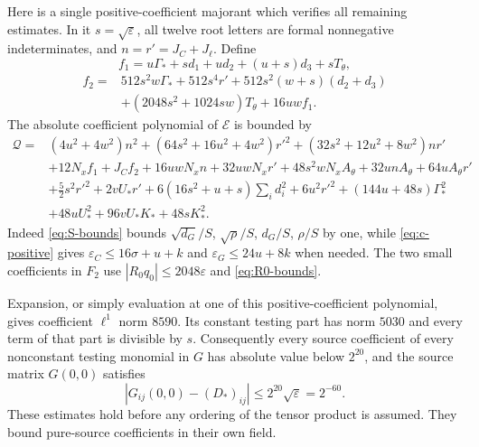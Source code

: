 \documentclass[11pt]{article}
\newcommand{\eps}{\varepsilon}
\begin{document}
Here is a single positive-coefficient majorant which verifies
all remaining estimates. In it $s=\sqrt\eps$, all twelve root
letters are formal nonnegative indeterminates, and
$n=r'=J_C+J_\ell$. Define
\[
 f_1=u\Gamma_*+sd_1+ud_2+(u+s)d_3+sT_\theta,
\]
\[
\begin{split}
 f_2={}&512s^2w\Gamma_*+512s^4r'
  +512s^2(w+s)(d_2+d_3)\\
 &+(2048s^2+1024sw)T_\theta+16uwf_1.
\end{split}
\]
The absolute coefficient polynomial of $\mathcal E$ is bounded by
\begin{align*}
 \mathcal Q={}&(4u^2+4w^2)n^2
 +(64s^2+16u^2+4w^2)r'^2
 +(32s^2+12u^2+8w^2)nr'\\
 &+12N_xf_1+J_Cf_2+16uwN_xn+32uwN_xr'
      +48s^2wN_xA_\theta+32unA_\theta+64uA_\theta r'\\
 &+\tfrac52s^2r'^2+2vU_*r'
      +6(16s^2+u+s)\sum_i d_i^2+6u^2r'^2
      +(144u+48s)\Gamma_*^2\\
 &+48uU_*^2+96vU_*K_*+48sK_*^2.
\end{align*}
Indeed \eqref{eq:S-bounds} bounds $\sqrt{d_G}/S$, $\sqrt\rho/S$,
$d_G/S$, $\rho/S$ by one, while \eqref{eq:c-positive} gives
$\eps_C\le16\sigma+u+k$ and $\eps_G\le24u+8k$ when needed.
The two small coefficients in $F_2$ use
$|R_0q_0|\le2048\eps$ and \eqref{eq:R0-bounds}.

Expansion, or simply evaluation at one of this positive-coefficient
polynomial, gives coefficient $\ell^1$ norm $8590$. Its constant
testing part has norm $5030$ and every term of that part is
divisible by $s$. Consequently every source coefficient of every
nonconstant testing monomial in $G$ has absolute value below
$2^{20}$, and the source matrix $G(0,0)$ satisfies
\begin{equation}\label{eq:matrixbounds}
 |G_{ij}(0,0)-(D_*)_{ij}|\le2^{20}\sqrt\eps=2^{-60}.
\end{equation}
These estimates hold before any ordering of the tensor product is
assumed. They bound pure-source coefficients in their own field.
\end{document}
